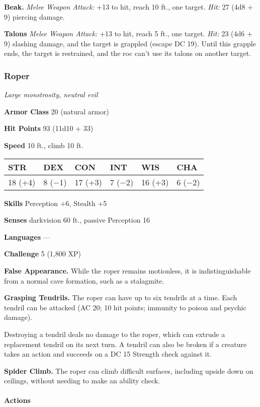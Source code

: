 \documentclass[
]{article}
\begin{document}
\textbf{Beak.} \emph{Melee Weapon Attack:} +13 to hit, reach 10 ft., one
target. \emph{Hit:} 27 (4d8 + 9) piercing damage.

\textbf{Talons} \emph{Melee Weapon Attack:} +13 to hit, reach 5 ft., one
target. \emph{Hit:} 23 (4d6 + 9) slashing damage, and the target is
grappled (escape DC 19). Until this grapple ends, the target is
restrained, and the roc can't use its talons on another target.

\hypertarget{roper}{%
\subsubsection{Roper}\label{roper}}

\emph{Large monstrosity, neutral evil}

\textbf{Armor Class} 20 (natural armor)

\textbf{Hit Points} 93 (11d10 + 33)

\textbf{Speed} 10 ft., climb 10 ft.

\begin{longtable}[]{@{}llllll@{}}
\toprule
STR & DEX & CON & INT & WIS & CHA\tabularnewline
\midrule
\endhead
18 (+4) & 8 (−1) & 17 (+3) & 7 (−2) & 16 (+3) & 6 (−2)\tabularnewline
\bottomrule
\end{longtable}

\textbf{Skills} Perception +6, Stealth +5

\textbf{Senses} darkvision 60 ft., passive Perception 16

\textbf{Languages} ---

\textbf{Challenge} 5 (1,800 XP)

\textbf{False Appearance.} While the roper remains motionless, it is
indistinguishable from a normal cave formation, such as a stalagmite.

\textbf{Grasping Tendrils.} The roper can have up to six tendrils at a
time. Each tendril can be attacked (AC 20; 10 hit points; immunity to
poison and psychic damage).

Destroying a tendril deals no damage to the roper, which can extrude a
replacement tendril on its next turn. A tendril can also be broken if a
creature takes an action and succeeds on a DC 15 Strength check against
it.

\textbf{Spider Climb.} The roper can climb difficult surfaces, including
upside down on ceilings, without needing to make an ability check.

\hypertarget{actions-3}{%
\paragraph{Actions}\label{actions-3}}
\end{document}
